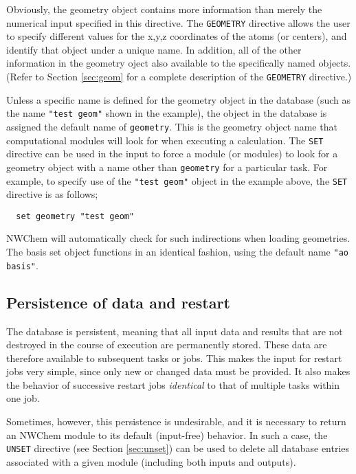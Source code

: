 Obviously, the geometry object contains more information than merely the
numerical input specified in this directive.  The \verb+GEOMETRY+
directive allows the user to specify different values for the x,y,z
coordinates of the atoms (or centers), and identify that object under
a unique name.  In addition, all of the other information in the 
geometry oject also available
to the specifically named objects.  (Refer to Section
\ref{sec:geom} for a complete description of the {\tt GEOMETRY}
directive.)

Unless a specific name is defined for the geometry object in the
database (such as the name \verb+"test geom"+ shown in the
example), the object in the database is assigned the default name of
\verb+geometry+.  This is the geometry object name that computational
modules will look for when executing a calculation.  The {\tt SET}
directive can be used in the input to force a module (or modules) to
look for a geometry object with a name other than \verb+geometry+
for a particular task.  For example, to specify use of the 
\verb+"test geom"+ object in the example above, the \verb+SET+
directive is as follows;

\begin{verbatim}
  set geometry "test geom"
\end{verbatim}

NWChem will automatically check for such indirections when loading
geometries.  The basis set object functions in an identical fashion,
using the default name \verb+"ao basis"+.


\subsection{Persistence of data and restart}
\label{sec:persist}

The database is persistent, meaning that all input data and results
that are not destroyed in the course of execution are permanently
stored.  These data are therefore available to subsequent tasks or
jobs.  This makes the input for restart jobs very simple, since only
new or changed data must be provided.  It also makes the behavior of
successive restart jobs {\em identical} to that of multiple tasks
within one job.  

Sometimes, however, this persistence is undesirable, and it is
necessary to return an NWChem module to its default (input-free)
behavior. In such a case, the \verb+UNSET+ directive (see Section
\ref{sec:unset}) can be used to delete all database entries associated
with a given module (including both inputs and outputs).







